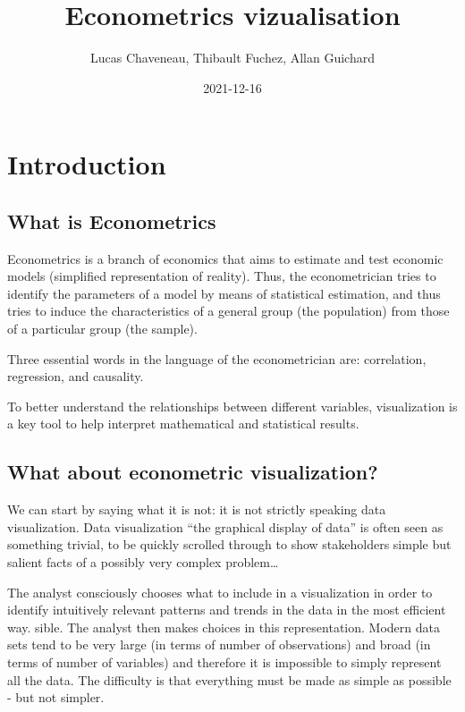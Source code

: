 \documentclass[
]{report}
\title{Econometrics vizualisation}
\author{Lucas Chaveneau, Thibault Fuchez, Allan Guichard}
\date{2021-12-16}
\begin{document}
\maketitle

{
\setcounter{tocdepth}{1}
\tableofcontents
}
\hypertarget{introduction}{%
\chapter{Introduction}\label{introduction}}

\hypertarget{what-is-econometrics}{%
\section{What is Econometrics}\label{what-is-econometrics}}

Econometrics is a branch of economics that aims to estimate and test economic models (simplified representation of reality). Thus, the econometrician tries to identify the parameters of a model by means of statistical estimation, and thus tries to induce the characteristics of a general group (the population) from those of a particular group (the sample).

Three essential words in the language of the econometrician are: correlation, regression, and causality.

To better understand the relationships between different variables, visualization is a key tool to help interpret mathematical and statistical results.

\hypertarget{what-about-econometric-visualization}{%
\section{What about econometric visualization?}\label{what-about-econometric-visualization}}

We can start by saying what it is not: it is not strictly speaking data visualization.
Data visualization ``the graphical display of data'' is often seen as something trivial, to be quickly scrolled through to show stakeholders simple but salient facts of a possibly very complex problem\ldots{}

The analyst consciously chooses what to include in a visualization in order to identify intuitively relevant patterns and trends in the data in the most efficient way. sible. The analyst then makes choices in this representation. Modern data sets tend to be very large (in terms of number of observations) and broad (in terms of number of variables) and therefore it is impossible to simply represent all the data. The difficulty is that everything must be made as simple as possible - but not simpler.
\end{document}
